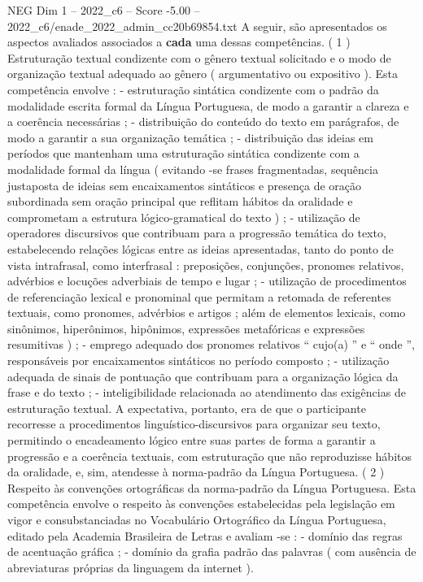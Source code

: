 \begin{textsample}{NEG Dim 1 – 2022\_c6 – Score -5.00 – 2022\_c6/enade\_2022\_admin\_cc20b69854.txt}
A seguir, são apresentados os aspectos avaliados associados a \textbf{cada} uma dessas competências. ( 1 ) Estruturação textual condizente com o gênero textual solicitado e o modo de organização textual adequado ao gênero ( argumentativo ou expositivo ).
Esta competência envolve : - estruturação sintática condizente com o padrão da modalidade escrita formal da Língua Portuguesa, de modo a garantir a clareza e a coerência necessárias ; - distribuição do conteúdo do texto em parágrafos, de modo a garantir a sua organização temática ; - distribuição das ideias em períodos que mantenham uma estruturação sintática condizente com a modalidade formal da língua ( evitando -se frases fragmentadas, sequência justaposta de ideias sem encaixamentos sintáticos e presença de oração subordinada sem oração principal que reflitam hábitos da oralidade e comprometam a estrutura lógico-gramatical do texto ) ; - utilização de operadores discursivos que contribuam para a progressão temática do texto, estabelecendo relações lógicas entre as ideias apresentadas, tanto do ponto de vista intrafrasal, como interfrasal : preposições, conjunções, pronomes relativos, advérbios e locuções adverbiais de tempo e lugar ; - utilização de procedimentos de referenciação lexical e pronominal que permitam a retomada de referentes textuais, como pronomes, advérbios e artigos ; além de elementos lexicais, como sinônimos, hiperônimos, hipônimos, expressões metafóricas e expressões resumitivas ) ; - emprego adequado dos pronomes relativos “ cujo(a) ” e “ onde ”, responsáveis por encaixamentos sintáticos no período composto ; - utilização adequada de sinais de pontuação que contribuam para a organização lógica da frase e do texto ; - inteligibilidade relacionada ao atendimento das exigências de estruturação textual.
A expectativa, portanto, era de que o participante recorresse a procedimentos linguístico-discursivos para organizar seu texto, permitindo o encadeamento lógico entre suas partes de forma a garantir a progressão e a coerência textuais, com estruturação que não reproduzisse hábitos da oralidade, e, sim, atendesse à norma-padrão da Língua Portuguesa. ( 2 ) Respeito às convenções ortográficas da norma-padrão da Língua Portuguesa.
Esta competência envolve o respeito às convenções estabelecidas pela legislação em vigor e consubstanciadas no Vocabulário Ortográfico da Língua Portuguesa, editado pela Academia Brasileira de Letras e avaliam -se : - domínio das regras de acentuação gráfica ; - domínio da grafia padrão das palavras ( com ausência de abreviaturas próprias da linguagem da internet ).

\end{textsample}
